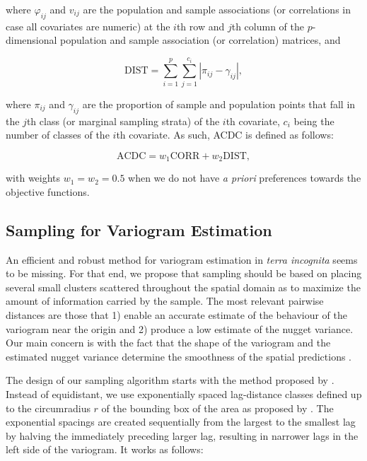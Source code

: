 \noindent where $\varphi_{ij}$ and $v_{ij}$ are the population and sample associations (or correlations in case 
all covariates are numeric) at the $i$th row and $j$th column of the $p$-dimensional population and sample 
association (or correlation) matrices, and

\begin{equation}\label{eqn:chap09-dist} %
 \text{DIST} = \sum_{i=1}^{p}\sum_{j=1}^{c_i} |\pi_{ij} - \gamma_{ij}|,
\end{equation}

\noindent where $\pi_{ij}$ and $\gamma_{ij}$ are the proportion of sample and population points that fall in 
the $j$th class (or marginal sampling strata) of the $i$th covariate, $c_i$ being the number of classes of the 
$i$th covariate. As such, ACDC is defined as follows:

\begin{equation}\label{eqn:chap08-acdc} %
 \text{ACDC} = w_1\text{CORR} + w_2 \text{DIST},
\end{equation}

\noindent with weights $w_1 = w_2 = 0.5$ when we do not have \emph{a priori} preferences towards the objective 
functions.

\subsection{Sampling for Variogram Estimation}

An efficient and robust method for variogram estimation in \emph{terra incognita} seems to be missing. For that 
end, we propose that sampling should be based on placing several small clusters scattered throughout the 
spatial domain as to maximize the amount of information carried by the sample. The most relevant pairwise 
distances are those that 1) enable an accurate estimate of the 
behaviour of the variogram near the origin and 2) produce a low estimate of the nugget variance. Our main 
concern 
is with the fact that the shape of the variogram and the estimated nugget variance determine the smoothness of 
the spatial predictions \cite{WebsterEtAl2007}.

The design of our sampling algorithm starts with the method proposed by \citet{WarrickEtAl1987}. Instead of 
equidistant, we use exponentially spaced lag-distance classes defined up to the circumradius $r$ of the 
bounding box of the area as proposed by \citet{TruongEtAl2013}. The exponential spacings are created 
sequentially from the largest to the smallest lag by halving the immediately preceding larger lag, resulting in 
narrower lags in the left side of the variogram. It works as follows:

